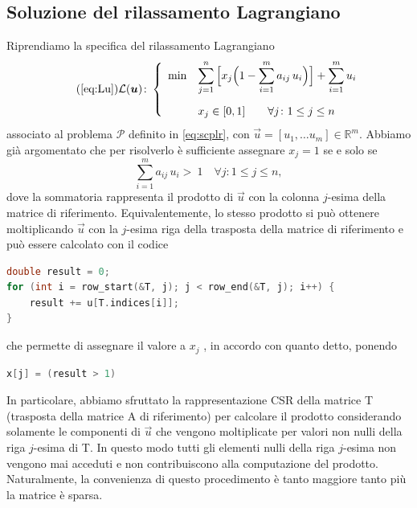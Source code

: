 \subsection{Soluzione del rilassamento Lagrangiano}
Riprendiamo la specifica del rilassamento Lagrangiano
\begin{equation}\tag{\ref{eq:Lu}}
   \mathcal{L}(\vec{u})\colon
    \left\{
    \begin{array}{ll}
        \min & \displaystyle\sum_{j=1}^n \Big[x_j \Big(1 - \sum_{i = 1}^m a_{ij}\, u_i\Big)\Big] + \sum_{i = 1}^m u_i
        \\[20pt]
             & x_j \in [0, 1] \qquad \forall j\colon 1 \leq j \leq n
    \end{array}\right.
\end{equation}
associato al problema \( \mathcal{P} \) definito in \eqref{eq:scplr}, con \( \vec{u} = [u_1, \ldots u_m] \in
\mathbb{R}^m \). Abbiamo già argomentato che per risolverlo è sufficiente assegnare \( x_j = 1 \) se e
solo se
\begin{equation}
    \sum_{i = 1}^m a_{ij}\,u_i >~1 \quad \forall j\colon 1\leq j \leq n,
\end{equation}
dove la sommatoria rappresenta il prodotto di
\(
    \vec{u}
\)
con la colonna \( j\)-esima della matrice di riferimento. Equivalentemente, lo stesso prodotto si può ottenere moltiplicando
\( \vec{u} \) con la \( j \)-esima riga della trasposta della matrice di riferimento e può essere calcolato con il
codice
\begin{inline}
\begin{lstlisting}[style = style2, language=c]
double result = 0;
for (int i = row_start(&T, j); j < row_end(&T, j); i++) {
    result += u[T.indices[i]];
}
\end{lstlisting}
\end{inline}
\noindent
che permette di assegnare il valore a \( x_j \) , in accordo con quanto detto, ponendo
\begin{inline}
\begin{lstlisting}[style = style2, language=c]
x[j] = (result > 1)
\end{lstlisting}
\end{inline}
\noindent
In particolare, abbiamo sfruttato la rappresentazione CSR della matrice {\jbm T} (trasposta della matrice {\jbm A} di
riferimento) per calcolare il prodotto considerando solamente le componenti di \( \vec{u} \) che vengono moltiplicate
per valori non nulli della riga \( j \)-esima di {\jbm T}. In questo modo tutti gli elementi nulli della riga \( j
\)-esima non vengono mai acceduti e non contribuiscono alla computazione del prodotto. Naturalmente, la convenienza di
questo procedimento è tanto maggiore tanto più la matrice è sparsa.

